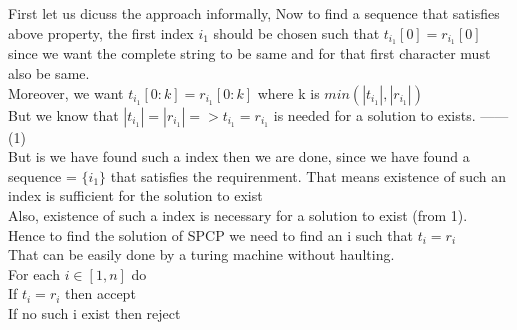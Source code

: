 \documentclass{article}
\begin{document}
First let us dicuss the approach informally, Now to find a sequence that satisfies above property, the first index $i_1$ should be chosen such that $t_{i_1}[0] = r_{i_1}[0]$ since we want the complete string to be same 
and for that first character must also be same.\\
Moreover, we want $t_{i_1}[0:k] = r_{i_1}[0:k]$ where k is $min(|t_{i_1}|,|r_{i_1}|)$\\
But we know that $|t_{i_1}| = |r_{i_1}| => t_{i_1} = r_{i_1}$ is needed for a solution to exists. ------ (1)\\
But is we have found such a index then we are done, since we have found a sequence = $\{i_1\}$  that satisfies the requirenment. That means existence of such an index is sufficient for the solution to exist\\
Also, existence of such a index is necessary for a solution to exist (from 1).\\
Hence to find the solution of SPCP we need to find an i such that $t_i = r_i$\\ That can be easily done by a turing machine without haulting.\\

For each $i \in [1,n]$ do\\
\hspace*{2cm} If $t_i = r_i$ then accept\\
\hspace*{0.5cm} If no such i exist then reject\\

\pagebreak
\end{document}
